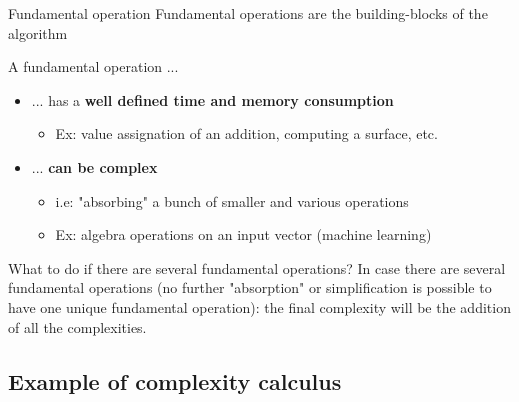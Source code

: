\documentclass{beamer}[10pt, usepdftitle=false, handout]
\begin{document}
	\begin{frame}
	
	\begin{exampleblock}{Fundamental operation}
	Fundamental operations are the building-blocks of the algorithm\footnotemark
	\end{exampleblock}	
	A fundamental operation ...	
	\begin{itemize}
	
	\item {... has a \textbf{well defined time and memory consumption}
		\begin{itemize}
			\item {Ex: value assignation of an addition, computing a surface, etc.}
		\end{itemize}				
	}
	\item {... \textbf{can be complex}
	\begin{itemize}
	\item{i.e: "absorbing" a bunch of smaller and various operations}
	\item{Ex: algebra operations on an input vector (machine learning)}
	\end{itemize}
	}
		
	\end{itemize}		

	\pause
	
	\begin{alertblock}{What to do if there are several fundamental operations?}
	In case there are several fundamental operations (no further "absorption" or simplification is possible to have one unique fundamental operation): the final complexity will be the addition of all the complexities.\end{alertblock}
	
	
	\end{frame}
		
	\subsection{Example of complexity calculus}	
	
\end{document}
